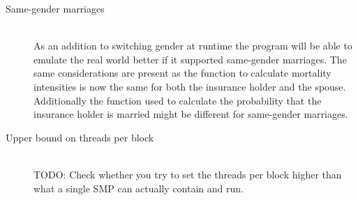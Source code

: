 \begin{description}
\item[Same-gender marriages] \hfill \\
As an addition to switching gender at runtime the program will be able to emulate the real world better if it supported same-gender marriages. The same considerations are present as the function to calculate mortality intensities is now the same for both the insurance holder and the spouse. Additionally the function used to calculate the probability that the insurance holder is married might be different for same-gender marriages. \\

\item[Upper bound on threads per block] \hfill \\
TODO: Check whether you try to set the threads per block higher than what a single SMP can actually contain and run.

\end{description}
